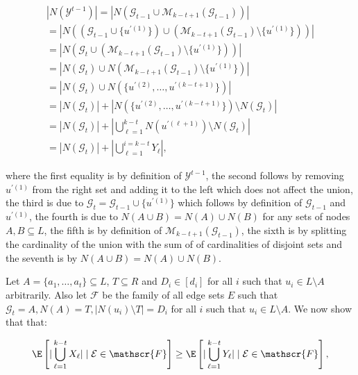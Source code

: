 \[\begin{gathered}
\displaystyle|N(\mathcal{Y}^{t-1})| \displaystyle=|N(\mathcal{G}_{t-1}\cup\mathcal{M}_{k-t+1}(\mathcal{G}_{t-1}))| \\
\displaystyle=|N((\mathcal{G}_{t-1}\cup\{u^{\prime(1)}\})\cup(\mathcal{M}_{k-t+1}(\mathcal{G}_{t-1})\setminus\{u^{\prime(1)}\}))| \\
\displaystyle=|N(\mathcal{G}_{t}\cup(\mathcal{M}_{k-t+1}(\mathcal{G}_{t-1})\setminus\{u^{\prime(1)}\}))| \\
\displaystyle=|N(\mathcal{G}_{t})\cup N(\mathcal{M}_{k-t+1}(\mathcal{G}_{t-1})\setminus\{u^{\prime(1)}\})| \\
\displaystyle=|N(\mathcal{G}_{t})\cup N(\{u^{\prime(2)},\dots,u^{\prime(k-t+1)}\})| \\
\displaystyle=|N(\mathcal{G}_{t})|+|N(\{u^{\prime(2)},\dots,u^{\prime(k-t+1)}\})\setminus N(\mathcal{G}_{t})| \\
\displaystyle=|N(\mathcal{G}_{t})|+|\bigcup_{\ell=1}^{k-t}{N(u^{\prime(\ell+1)})\setminus N(\mathcal{G}_{t})}| \\
\displaystyle=|N(\mathcal{G}_{t})|+|\bigcup_{\ell=1}^{i=k-t}{Y_{\ell}}|,
\end{gathered}\]


where the first equality is by definition of $\mathcal{Y}^{t-1}$, the second follows by removing $u^{\prime(1)}$ from the right set and adding it to the left which does not affect the union, the third is due to $\mathcal{G}_{t}=\mathcal{G}_{t-1}\cup\{u^{\prime(1)}\}$ which follows by definition of $\mathcal{G}_{t-1}$ and $u^{\prime(1)}$, the fourth is due to $N(A\cup B)=N(A)\cup N(B)$ for any sets of nodes $A,B\subseteq L$, the fifth is by definition of $\mathcal{M}_{k-t+1}(\mathcal{G}_{t-1})$, the sixth is by splitting the cardinality of the union with the sum of of cardinalities of disjoint sets and the seventh is by $N(A\cup B)=N(A)\cup N(B)$.\par




Let $A=\{a_{1},\dots,a_{t}\}\subseteq L$, $T\subseteq R$ and $D_{i}\in[d_{i}]$ for all $i$ such that $u_{i}\in L\setminus A$ arbitrarily. Also let $\mathscr{F}$ be the family of all edge sets $E$ such that $\mathcal{G}_{t}=A,N(A)=T,|N(u_{i})\setminus T|=D_{i}$ for all $i$ such that $u_{i}\in L\setminus A$.
We now show that that:\par


\[\begin{gathered}
\displaystyle\E\left[|\bigcup_{\ell=1}^{k-t}{X_{\ell}}|\mid\mathcal{E}\in\mathscr{F}\right]\geq\E\left[|\bigcup_{\ell=1}^{k-t}{Y_{\ell}}|\mid\mathcal{E}\in\mathscr{F}\right],
\end{gathered}\]


